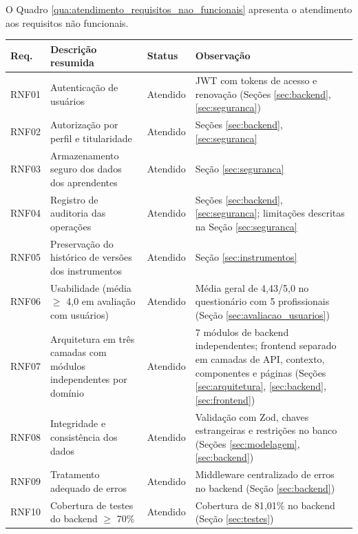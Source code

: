 O Quadro \ref{qua:atendimento_requisitos_nao_funcionais} apresenta o atendimento aos requisitos não funcionais.

\begin{quadro}[H]
\centering
\small
\caption{Atendimento aos requisitos não funcionais}
\begin{tabular}{p{1.2cm} p{7.5cm} p{1.5cm} p{4cm}}
\hline
\textbf{Req.} & \textbf{Descrição resumida} & \textbf{Status} & \textbf{Observação} \\
\hline
RNF01 & Autenticação de usuários & Atendido & JWT com tokens de acesso e renovação (Seções \ref{sec:backend}, \ref{sec:seguranca}) \\
RNF02 & Autorização por perfil e titularidade & Atendido & Seções \ref{sec:backend}, \ref{sec:seguranca} \\
RNF03 & Armazenamento seguro dos dados dos aprendentes & Atendido & Seção \ref{sec:seguranca} \\
RNF04 & Registro de auditoria das operações & Atendido & Seções \ref{sec:backend}, \ref{sec:seguranca}; limitações descritas na Seção \ref{sec:seguranca} \\
RNF05 & Preservação do histórico de versões dos instrumentos & Atendido & Seção \ref{sec:instrumentos} \\
RNF06 & Usabilidade (média $\geq$ 4,0 em avaliação com usuários) & Atendido & Média geral de 4,43/5,0 no questionário com 5 profissionais (Seção \ref{sec:avaliacao_usuarios}) \\
RNF07 & Arquitetura em três camadas com módulos independentes por domínio & Atendido & 7 módulos de backend independentes; frontend separado em camadas de API, contexto, componentes e páginas (Seções \ref{sec:arquitetura}, \ref{sec:backend}, \ref{sec:frontend}) \\
RNF08 & Integridade e consistência dos dados & Atendido & Validação com Zod, chaves estrangeiras e restrições no banco (Seções \ref{sec:modelagem}, \ref{sec:backend}) \\
RNF09 & Tratamento adequado de erros & Atendido & Middleware centralizado de erros no backend (Seção \ref{sec:backend}) \\
RNF10 & Cobertura de testes do backend $\geq$ 70\% & Atendido & Cobertura de 81,01\% no backend (Seção \ref{sec:testes}) \\
\hline
\end{tabular}
\label{qua:atendimento_requisitos_nao_funcionais}
\end{quadro}

